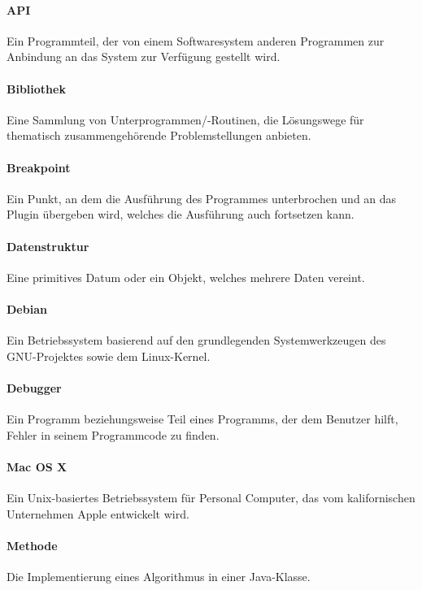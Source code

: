 \documentclass[a4paper]{report}
\begin{document}
\paragraph{API} Ein Programmteil, der von einem Softwaresystem anderen Programmen zur Anbindung an das System zur Verfügung gestellt wird.

\paragraph{Bibliothek} Eine Sammlung von Unterprogrammen/-Routinen, die Lösungswege für thematisch zusammengehörende Problemstellungen anbieten.

\paragraph{Breakpoint} Ein Punkt, an dem die Ausführung des Programmes unterbrochen und an das Plugin übergeben wird, welches die Ausführung auch fortsetzen kann.

\paragraph{Datenstruktur} Eine primitives Datum oder ein Objekt, welches mehrere Daten vereint.

\paragraph{Debian}  Ein Betriebssystem basierend auf den grundlegenden Systemwerkzeugen des GNU-Projektes sowie dem Linux-Kernel.

\paragraph{Debugger} Ein Programm beziehungsweise Teil eines Programms, der dem Benutzer hilft, Fehler in seinem Programmcode zu finden.

\paragraph{Mac OS X} Ein Unix-basiertes Betriebssystem für Personal Computer, das vom kalifornischen Unternehmen Apple entwickelt wird.

\paragraph{Methode} Die Implementierung eines Algorithmus in einer Java-Klasse.
\end{document}
